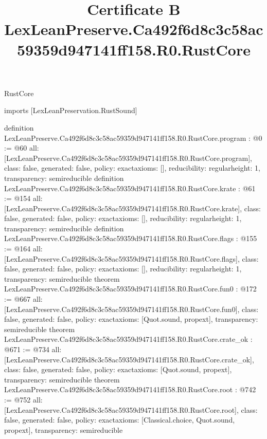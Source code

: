 \begin{lexlean}{RustCore}
\title{Certificate B LexLeanPreserve.Ca492f6d8c3c58ac59359d947141ff158.R0.RustCore}
\begin{coremodule}
imports [LexLeanPreservation.RustSound]

definition LexLeanPreserve.Ca492f6d8c3c58ac59359d947141ff158.R0.RustCore.program : @0 := @60 {
  all: [LexLeanPreserve.Ca492f6d8c3c58ac59359d947141ff158.R0.RustCore.program],
  class: false,
  generated: false,
  policy: exact{axioms: []},
  reducibility: regular{height: 1},
  transparency: semireducible
}
definition LexLeanPreserve.Ca492f6d8c3c58ac59359d947141ff158.R0.RustCore.krate : @61 := @154 {
  all: [LexLeanPreserve.Ca492f6d8c3c58ac59359d947141ff158.R0.RustCore.krate],
  class: false,
  generated: false,
  policy: exact{axioms: []},
  reducibility: regular{height: 1},
  transparency: semireducible
}
definition LexLeanPreserve.Ca492f6d8c3c58ac59359d947141ff158.R0.RustCore.flags : @155 := @164 {
  all: [LexLeanPreserve.Ca492f6d8c3c58ac59359d947141ff158.R0.RustCore.flags],
  class: false,
  generated: false,
  policy: exact{axioms: []},
  reducibility: regular{height: 1},
  transparency: semireducible
}
theorem LexLeanPreserve.Ca492f6d8c3c58ac59359d947141ff158.R0.RustCore.fun0 : @172 := @667 {
  all: [LexLeanPreserve.Ca492f6d8c3c58ac59359d947141ff158.R0.RustCore.fun0],
  class: false,
  generated: false,
  policy: exact{axioms: [Quot.sound, propext]},
  transparency: semireducible
}
theorem LexLeanPreserve.Ca492f6d8c3c58ac59359d947141ff158.R0.RustCore.crate_ok : @671 := @734 {
  all: [LexLeanPreserve.Ca492f6d8c3c58ac59359d947141ff158.R0.RustCore.crate_ok],
  class: false,
  generated: false,
  policy: exact{axioms: [Quot.sound, propext]},
  transparency: semireducible
}
theorem LexLeanPreserve.Ca492f6d8c3c58ac59359d947141ff158.R0.RustCore.root : @742 := @752 {
  all: [LexLeanPreserve.Ca492f6d8c3c58ac59359d947141ff158.R0.RustCore.root],
  class: false,
  generated: false,
  policy: exact{axioms: [Classical.choice, Quot.sound, propext]},
  transparency: semireducible
}


\end{coremodule}
\end{lexlean}
